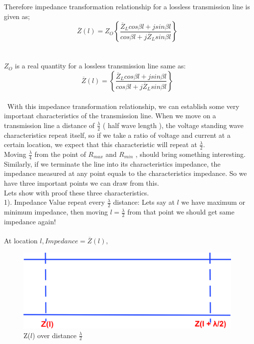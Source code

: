Therefore impedance transformation relationship for a lossless transmission line is given as;
\begin{equation}
\overline{Z}(l) = Z_{O}\left\lbrace \frac{\overline{Z}_Lcos\beta l + jsin\beta l}{cos\beta l + j\overline{Z}_Lsin\beta l}\right\rbrace 
\end{equation}\\\\
$Z_O$ is a real quantity for a lossless transmission line same as:
\begin{equation}
\overline{Z}(l) = \left\lbrace \frac{\overline{Z}_Lcos\beta l + jsin\beta l}{cos\beta l + j\overline{Z}_Lsin\beta l}\right\rbrace 
\end{equation}\\\
With this impedance transformation relationship, we can establish some very important characteristics of the transmission line. When we move on a transmission line a distance of $\frac{\lambda}{2}$ ( half wave length ), the voltage standing wave characteristics repeat itself, so if we take a ratio of voltage and current at a certain location, we expect that this characteristic will repeat at $\frac{\lambda}{2}$.\\
Moving $\frac{\lambda}{4}$ from the point of $R_{max}$ and $R_{min}$ , should bring something interesting. Similarly, if we terminate the line into its characteristics impedance, the impedance measured at any point equals to the characteristics impedance. So we have three important points we can draw from this.\\
Lets show with proof these three characteristics.\\

1).  Impedance Value repeat every $\frac{\lambda}{2}$ distance: Lets say at $l$ we have maximum or minimum impedance, then moving $l=\frac{\lambda}{2}$ from that point we should get same impedance again!\\\\
At location $l , Impedance =\overline{Z}(l),$\\
\begin{figure}[h]
\centering
\includegraphics[width=0.7\linewidth]{./graphics/astyui;f}
\caption{Z($l$) over distance $\frac{\lambda}{2}$}
\label{fig:astyuif}
\end{figure}

